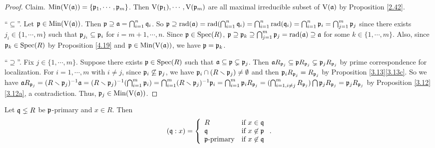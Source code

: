 \begin{proof}
    Claim. $\operatorname{Min}(\operatorname{V}(\mathfrak{a})) = \{\mathfrak{p}_1,\cdots,\mathfrak{p}_m\}$. Then $\operatorname{V}(\mathfrak{p}_1),\cdots,\operatorname{V}(\mathfrak{p}_m)$ are all maximal irreducible subset of $\operatorname{V}(\mathfrak{a})$ by Proposition \ref{2.42}. \par
    ``$\subseteq$''. Let $\mathfrak{p} \in \operatorname{Min}(\operatorname{V}(\mathfrak{a}))$. Then $\mathfrak{p} \supseteq \mathfrak{a} = \bigcap_{i=1}^{n} \mathfrak{q}_i$. So $\mathfrak{p} \supseteq \operatorname{rad}(\mathfrak{a}) = \operatorname{rad}(\bigcap_{i=1}^{n}\mathfrak{q}_i) = \bigcap_{i=1}^{n} \operatorname{rad}(\mathfrak{q}_i) = \bigcap_{i=1}^{n} \mathfrak{p}_i = \bigcap_{j=1}^{m} \mathfrak{p}_j$ since there exists $j_i \in \{1,\cdots,m\}$ such that $\mathfrak{p}_{j_i} \subseteq \mathfrak{p}_i$ for $i = m+1,\cdots,n$. Since $\mathfrak{p} \in \operatorname{Spec}(R)$, $\mathfrak{p} \supseteq \mathfrak{p}_k \supseteq \bigcap_{j=1}^{m} \mathfrak{p}_j = \operatorname{rad}(\mathfrak{a}) \supseteq \mathfrak{a}$ for some $k \in \{1,\cdots,m\}$. Also, since $\mathfrak{p}_k \in \operatorname{Spec}(R)$ by Proposition \ref{4.19} and $\mathfrak{p} \in \operatorname{Min}(\operatorname{V}(\mathfrak{a}))$, we have $\mathfrak{p} = \mathfrak{p}_k$. \par 
    ``$\supseteq$''. Fix $j \in \{1,\cdots,m\}$. Suppose there exists $\mathfrak{p} \in \operatorname{Spec}(R)$ such that $\mathfrak{a} \subseteq \mathfrak{p} \subsetneq \mathfrak{p}_j$. Then $\mathfrak{a} R_{\mathfrak{p}_j} \subseteq \mathfrak{p} R_{\mathfrak{p}_j} \subsetneq \mathfrak{p}_jR_{\mathfrak{p}_j}$ by prime correspondence for localization. For $i = 1,\cdots,m$ with $i \neq j$, since $\mathfrak{p}_i \not \subseteq \mathfrak{p}_j$, we have $\mathfrak{p}_i \cap (R \smallsetminus \mathfrak{p}_j) \neq \emptyset$ and then $\mathfrak{p}_i R_{\mathfrak{p}_j} = R_{\mathfrak{p}_j}$ by Proposition \ref{3.13}\ref{3.13c}. So we have $\mathfrak{a} R_{\mathfrak{p}_j} = (R \smallsetminus \mathfrak{p}_j)^{-1} \mathfrak{a} = (R \smallsetminus \mathfrak{p}_j)^{-1} (\bigcap_{i=1}^{m} \mathfrak{p}_i) = \bigcap_{i=1}^{m} (R \smallsetminus \mathfrak{p}_j)^{-1} \mathfrak{p}_i = \bigcap_{i=1}^{m} \mathfrak{p}_i R_{\mathfrak{p}_j} = (\bigcap_{i=1,i \neq j}^{m} R_{\mathfrak{p}_j}) \bigcap \mathfrak{p}_jR_{\mathfrak{p}_j} = \mathfrak{p}_jR_{\mathfrak{p}_j}$ by Proposition \ref{3.12}\ref{3.12a}, a contradiction. Thus, $\mathfrak{p}_j \in \operatorname{Min}(\operatorname{V}(\mathfrak{a}))$.
\end{proof}

\begin{proposition}\label{4.29}
    Let $\mathfrak{q} \lneq R$ be $\mathfrak{p}$-primary and $x \in R$. Then 
    \[
        (\mathfrak{q}:x) = \left\{
            \begin{array}{ll}
                R &\text{if }x \in \mathfrak{q} \\
                \mathfrak{q} &\text{if }x \not \in \mathfrak{p} \\
                \mathfrak{p}\text{-primary} &\text{if }x \not \in \mathfrak{q} \\
            \end{array}
        \right..
    \]
\end{proposition}

